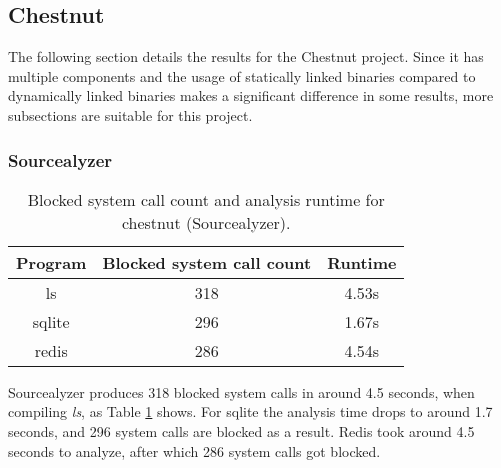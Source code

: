 \subsection {Chestnut}
The following section details the results for the Chestnut project.
Since it has multiple components and the usage of statically linked binaries compared to dynamically linked binaries makes a significant difference in some results, more subsections are suitable for this project.

\subsubsection {Sourcealyzer}
\begin{table}[!h]
\begin{center}
\caption{Blocked system call count and analysis runtime for chestnut (Sourcealyzer).}
\label{tbl:chestnut_src_results}
\begin{tabular}{||c c c||} 
 \hline
 Program & Blocked system call count & Runtime \\
 \hline\hline
 ls & 318 & 4.53s \\ 
 \hline
 sqlite & 296 & 1.67s \\ 
 \hline
 redis & 286 & 4.54s \\ 
 \hline
\end{tabular}
\end{center}
\end{table}
Sourcealyzer produces 318 blocked system calls in around 4.5 seconds, when compiling \textit{ls}, as Table \ref{tbl:chestnut_src_results} shows.
For sqlite the analysis time drops to around 1.7 seconds, and 296 system calls are blocked as a result.
Redis took around 4.5 seconds to analyze, after which 286 system calls got blocked.

